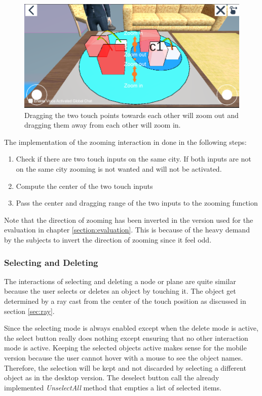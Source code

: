 \begin{figure}[htb]
    \centering
    \includegraphics[width=1\textwidth]{Implementation/img/zoom.png}
    \caption{Dragging the two touch points towards each other will zoom out and dragging them away from each other will zoom in.}\label{fig:zooming}
\end{figure}

The implementation of the zooming interaction in done in the following steps: 
\begin{enumerate}
    \item Check if there are two touch inputs on the same \gls{city}. If both inputs are not on the same city zooming is not wanted and will not be activated.
    \item Compute the center of the two touch inputs
    \item Pass the center and dragging range of the two inputs to the zooming function
\end{enumerate}

Note that the direction of zooming has been inverted in the version used for the evaluation in chapter \ref{section:evaluation}.
This is because of the heavy demand by the subjects to invert the direction of zooming since it feel odd.

\subsubsection{Selecting and Deleting}
The interactions of selecting and deleting a \gls{node} or \gls{plane} are quite similar because the user selects or deletes an object by touching it.
The object get determined by a ray cast from the center of the touch position as discussed in section \ref{sec:ray}.

Since the selecting mode is always enabled except when the delete mode is active, the select button really does nothing except ensuring that no other interaction mode is active.
Keeping the selected objects active makes sense for the mobile version because the user cannot hover with a mouse to see the object names.
Therefore, the selection will be kept and not discarded by selecting a different object as in the desktop version.
The deselect button call the already implemented \textit{UnselectAll} method that empties a list of selected items.

